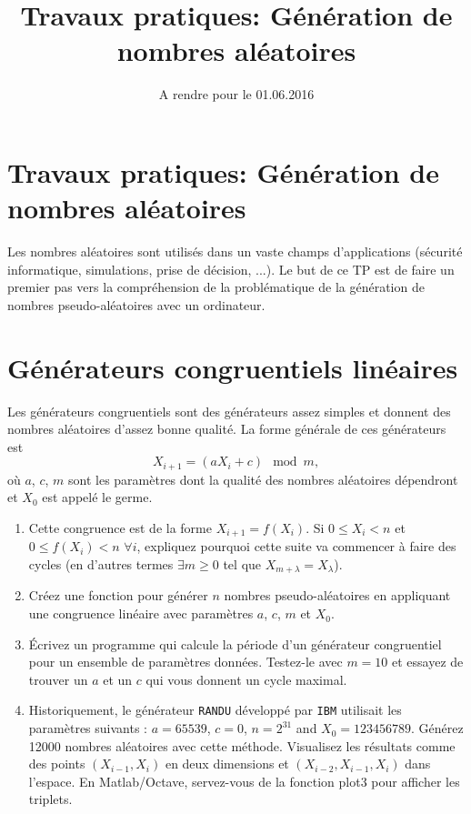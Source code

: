 \documentclass[a4paper,10pt]{article}
\title{Travaux pratiques: Génération de nombres aléatoires}
\date{A rendre pour le 01.06.2016}
\begin{document}
\maketitle

\section*{Travaux pratiques: Génération de nombres aléatoires}

Les nombres aléatoires sont utilisés dans un vaste champs d'applications (sécurité informatique, simulations, 
prise de décision, ...). Le but de ce TP est de faire un premier pas vers la compréhension de la problématique de 
la génération de nombres pseudo-aléatoires avec un ordinateur. 

\section*{Générateurs congruentiels linéaires}
Les générateurs congruentiels sont des générateurs assez simples et donnent des nombres aléatoires d'assez bonne qualité. 
La forme générale de ces générateurs est
\begin{equation}
 X_{i+1}=(aX_i+c)\mod m,
\end{equation}
où $a$, $c$, $m$ sont les paramètres dont la qualité des nombres aléatoires dépendront et $X_0$ est appelé le germe.

\begin{enumerate}
\item Cette congruence est de la forme $X_{i+1} = f(X_i)$. Si $0\leq X_i < n$ et $0\leq f (X_i ) < n$ $\forall i$, expliquez
pourquoi cette suite va commencer à faire des cycles (en d'autres termes $\exists m \geq 0$ tel que $X_{m+\lambda} = X_{\lambda}$).
 \item Créez une fonction pour générer $n$ nombres pseudo-aléatoires en appliquant une congruence linéaire avec paramètres $a$, $c$, $m$ et $X_0$.
 \item Écrivez un programme qui calcule la période d’un générateur congruentiel pour un ensemble de
paramètres données. Testez-le avec $m = 10$ et essayez de trouver un $a$ et un $c$ qui vous donnent
un cycle maximal.
\item Historiquement, le générateur \texttt{RANDU} développé par \texttt{IBM} utilisait les paramètres suivants :
$a = 65539$, $c = 0$, $n = 2^{31}$ and $X_0 = 123456789$. Générez 12000 nombres aléatoires avec
cette méthode. Visualisez les résultats comme des points $(X_{i-1} , X_i)$ en deux dimensions et
$(X_{i-2}, X_{i-1} , X_i )$ dans l’espace. En Matlab/Octave, servez-vous de la fonction plot3 pour afficher les triplets.
\end{enumerate}
\end{document}
